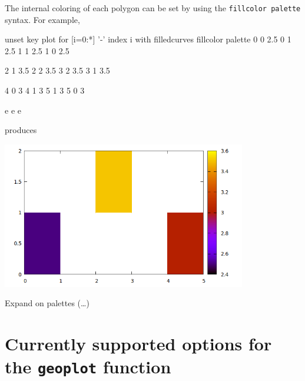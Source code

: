 \documentclass[a4paper]{article}
\begin{document}
\medskip

The internal coloring of each polygon can be set by using the
\texttt{fillcolor palette} syntax. For example,
\begin{scriptsize}
\begin{code}
unset key
plot for [i=0:*] '-' index i with filledcurves fillcolor palette
	0 0 2.5 
	0 1 2.5
	1 1 2.5
	1 0 2.5

	2 1 3.5 
	2 2 3.5
	3 2 3.5
	3 1 3.5

	4 0 3 
	4 1 3
	5 1 3
	5 0 3

e
e
e        
\end{code}
\end{scriptsize}
produces
\begin{center}
  \includegraphics[width=0.8\textwidth]{squares}
\end{center}

Expand on palettes (\ldots)

\section{Currently supported options for the \texttt{geoplot} function}
\label{sec:opts}
\end{document}
